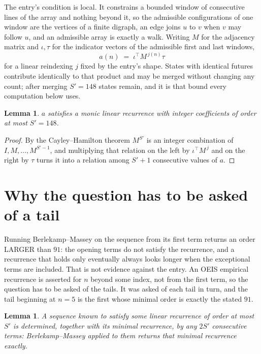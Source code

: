 \documentclass[11pt,a4paper]{article}
\theoremstyle{plain}
\newtheorem{lemma}[theorem]{Lemma}
\theoremstyle{definition}
\begin{document}
The entry's condition is local. It constrains a bounded window of consecutive lines of the
array and nothing beyond it, so the admissible configurations of one window are the vertices of
a finite digraph, an edge joins $u$ to $v$ when $v$ may follow $u$, and an admissible array is
exactly a walk. Writing $M$ for the adjacency matrix and $\iota,\tau$ for the indicator vectors
of the admissible first and last windows,
\[
a(n)\;=\;\iota^{\!\top}M^{\,j(n)}\tau
\]
for a linear reindexing $j$ fixed by the entry's shape. States with identical futures
contribute identically to that product and may be merged without changing any count; after
merging $S'=148$ states remain, and it is that bound every computation below uses.

\begin{lemma}\label{lem:cf}
$a$ satisfies a monic linear recurrence with integer coefficients of order at most $S'=148$.
\end{lemma}

\begin{proof}
By the Cayley--Hamilton theorem $M^{S'}$ is an integer combination of $I,M,\dots,M^{S'-1}$,
and multiplying that relation on the left by $\iota^{\!\top}M^{\,j}$ and on the right by
$\tau$ turns it into a relation among $S'+1$ consecutive values of $a$.
\end{proof}

\section{Why the question has to be asked of a tail}

Running Berlekamp--Massey on the sequence from its first term returns an order LARGER than $91$: the opening terms do not satisfy the recurrence, and a recurrence that holds only eventually always looks longer when the exceptional terms are included. That is not evidence against the entry. An OEIS empirical recurrence is asserted for $n$ beyond some index, not from the first term, so the question has to be asked of the tails. It was asked of each tail in turn, and the tail beginning at $n=5$ is the first whose minimal order is exactly the stated $91$.

\begin{lemma}\label{lem:bm}
A sequence known to satisfy some linear recurrence of order at most $S'$ is determined,
together with its minimal recurrence, by any $2S'$ consecutive terms: Berlekamp--Massey applied
to them returns that minimal recurrence exactly.
\end{lemma}
\end{document}
